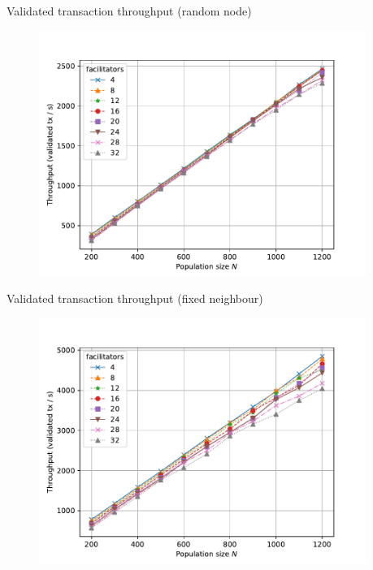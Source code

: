 \documentclass{beamer}
\begin{document}
\begin{frame}{Validated transaction throughput (random node)}
  \begin{figure}[h]
  \includegraphics[width=0.95\textwidth]{neighbour-random/throughput-vs-population}
  \centering
  \end{figure}
\end{frame}

\begin{frame}{Validated transaction throughput (fixed neighbour)}
  \begin{figure}[h]
  \includegraphics[width=0.95\textwidth]{neighbour-fixed/throughput-vs-population}
  \centering
  \end{figure}
\end{frame}
\end{document}
